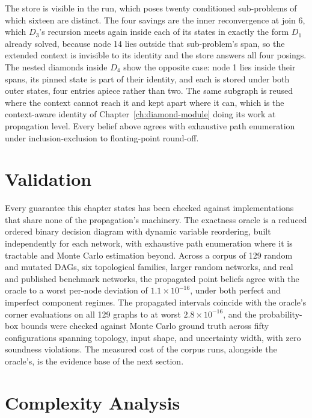 \documentclass[12pt]{report}
\begin{document}
The store is visible in the run, which poses twenty conditioned sub-problems of which sixteen are distinct. The four savings are the inner reconvergence at join 6, which $D_3$'s recursion meets again inside each of its states in exactly the form $D_1$ already solved, because node 14 lies outside that sub-problem's span, so the extended context is invisible to its identity and the store answers all four posings. The nested diamonds inside $D_4$ show the opposite case: node 1 lies inside their spans, its pinned state is part of their identity, and each is stored under both outer states, four entries apiece rather than two. The same subgraph is reused where the context cannot reach it and kept apart where it can, which is the context-aware identity of Chapter~\ref{ch:diamond-module} doing its work at propagation level. Every belief above agrees with exhaustive path enumeration under inclusion-exclusion to floating-point round-off.

\section{Validation}
\label{sec:pp-validation}

Every guarantee this chapter states has been checked against implementations that share none of the propagation's machinery. The exactness oracle is a reduced ordered binary decision diagram with dynamic variable reordering, built independently for each network, with exhaustive path enumeration where it is tractable and Monte Carlo estimation beyond. Across a corpus of 129 random and mutated DAGs, six topological families, larger random networks, and real and published benchmark networks, the propagated point beliefs agree with the oracle to a worst per-node deviation of $1.1 \times 10^{-16}$, under both perfect and imperfect component regimes. The propagated intervals coincide with the oracle's corner evaluations on all 129 graphs to at worst $2.8 \times 10^{-16}$, and the probability-box bounds were checked against Monte Carlo ground truth across fifty configurations spanning topology, input shape, and uncertainty width, with zero soundness violations. The measured cost of the corpus runs, alongside the oracle's, is the evidence base of the next section.

\section{Complexity Analysis}
\label{sec:pp-complexity}
\end{document}
